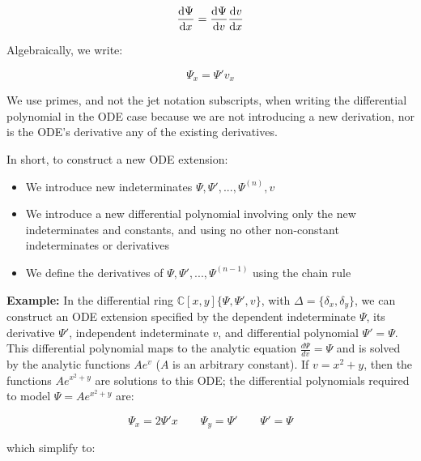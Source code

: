 \documentclass{article}
\theoremstyle{definition}
\theoremstyle{plain}
\begin{document}
\begin{equation}
\frac{{\rm d}\Psi}{{\rm d}x} = \frac{{\rm d}\Psi}{{\rm d}v} \frac{{\rm d}v}{{\rm d}x}
\end{equation}

Algebraically, we write:

\begin{equation}
\Psi_x = \Psi' v_x
\end{equation}

We use primes, and not the jet notation subscripts, when writing
the differential polynomial in the ODE case because we are not introducing a new derivation,
nor is the ODE's derivative any of the existing derivatives.

In short, to construct a new ODE extension:

\begin{itemize}
\item We introduce new indeterminates $\Psi, \Psi',..., \Psi^{(n)}, v$
\item We introduce a new differential polynomial involving only the new indeterminates and constants,
and using no other non-constant indeterminates or derivatives
\item We define the derivatives of $\Psi, \Psi',...,\Psi^{(n-1)}$ using the chain rule
\end{itemize}

{\bf Example:} In the differential ring $\mathbb{C}[x,y]\{\Psi,\Psi',v\}$, with
$\Delta = \{\delta_x, \delta_y\}$, we can construct an ODE
extension specified by the dependent indeterminate $\Psi$, its derivative $\Psi'$, independent indeterminate $v$, and differential polynomial
$\Psi' = \Psi$.  This differential polynomial
maps to the analytic equation $\frac{d\Psi}{dv}=\Psi$ and is solved
by the analytic functions $Ae^v$ ($A$ is an arbitrary constant).  If $v=x^2+y$, then
the functions $Ae^{x^2+y}$ are solutions to this ODE; the differential polynomials required to model $\Psi=Ae^{x^2+y}$ are:

\begin{equation}
\Psi_x = 2 \Psi' x \qquad
\Psi_y = \Psi' \qquad
\Psi' = \Psi
\end{equation}

which simplify to:
\end{document}
